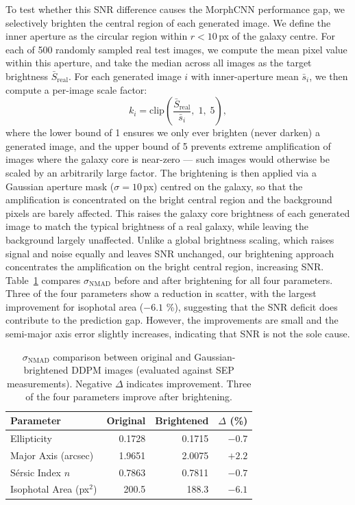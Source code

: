 \documentclass[fleqn,usenatbib]{mnras}
\begin{document}
To test whether this SNR difference causes the MorphCNN performance gap,
we selectively brighten the central region of each generated image.
We define the inner aperture as the circular region within $r < 10$\,px
of the galaxy centre.
For each of 500 randomly sampled real test images, we compute the mean
pixel value within this aperture, and take the median across all images
as the target brightness $\bar{S}_{\mathrm{real}}$.
For each generated image $i$ with inner-aperture mean $\bar{s}_i$, we
then compute a per-image scale factor:
\begin{equation}
    k_i = \mathrm{clip}\!\left(\frac{\bar{S}_{\mathrm{real}}}{\bar{s}_i},\;1,\;5\right),
    \label{eq:brighten_k}
\end{equation}
where the lower bound of 1 ensures we only ever brighten (never darken)
a generated image, and the upper bound of 5 prevents extreme
amplification of images where the galaxy core is near-zero ---
such images would otherwise be scaled by an arbitrarily large factor.
The brightening is then applied via a Gaussian aperture mask
($\sigma = 10$\,px) centred on the galaxy, so that the amplification
is concentrated on the bright central region and the background pixels
are barely affected.
This raises the galaxy core brightness of each generated image to match
the typical brightness of a real galaxy, while leaving the background
largely unaffected.
Unlike a global brightness scaling, which raises signal and noise
equally and leaves SNR unchanged, our brightening approach concentrates the
amplification on the bright central region, increasing SNR.
Table~\ref{tab:brightening} compares $\sigma_{\mathrm{NMAD}}$ before
and after brightening for all four parameters.
Three of the four parameters show a reduction in scatter, with
the largest improvement for isophotal area ($-6.1$ \%),
suggesting that the SNR deficit does contribute to the prediction gap.
However, the improvements are small and the semi-major axis error
slightly increases, indicating that SNR is not the sole cause.

\begin{table}
    \centering
    \caption{$\sigma_{\mathrm{NMAD}}$ comparison between original and
    Gaussian-brightened DDPM images (evaluated against SEP measurements).
    Negative $\Delta$ indicates improvement.
    Three of the four parameters improve after brightening.}
    \label{tab:brightening}
    \begin{tabular}{lrrr}
        \hline
        Parameter & Original & Brightened & $\Delta$ (\%) \\
        \hline
        Ellipticity          & 0.1728 & 0.1715 & $-0.7$ \\
        Major Axis (arcsec)  & 1.9651 & 2.0075 & $+2.2$ \\
        S\'{e}rsic Index $n$ & 0.7863 & 0.7811 & $-0.7$ \\
        Isophotal Area (px$^2$) & 200.5 & 188.3 & $-6.1$ \\
        \hline
    \end{tabular}
\end{table}
\end{document}
